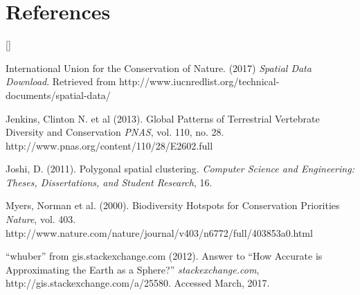\documentclass[11pt, fullpage,letterpaper]{article}
\def\beginrefs{\begin{list}%
        {[\arabic{equation}]}{\usecounter{equation}
         \setlength{\leftmargin}{2.0truecm}\setlength{\labelsep}{0.4truecm}%
         \setlength{\labelwidth}{1.6truecm}}}
\def\endrefs{\end{list}}
\def\bibentry#1{\item[\hbox{[#1]}]}
\begin{document}
	

		\pagebreak
	
	\section*{References}
		\beginrefs

			\bibentry{IUCN 17} International Union for the Conservation of Nature. (2017) \emph{Spatial Data Download}. Retrieved from http://www.iucnredlist.org/technical-documents/spatial-data/
			
			\bibentry{Jenkins 13} Jenkins, Clinton N. et al (2013). Global Patterns of Terrestrial Vertebrate Diversity and Conservation	\emph{PNAS}, vol. 110, no. 28. http://www.pnas.org/content/110/28/E2602.full

			\bibentry{Joshi 11} Joshi, D. (2011). Polygonal spatial clustering.  \emph{Computer Science and Engineering: Theses, Dissertations, and Student Research}, 16.
			
			\bibentry{Myers 00} Myers, Norman et al. (2000). Biodiversity Hotspots for Conservation Priorities	\emph{Nature}, vol. 403. http://www.nature.com/nature/journal/v403/n6772/full/403853a0.html
			
			\bibentry{Whuber 12} ``whuber'' from gis.stackexchange.com (2012). Answer to ``How Accurate is Approximating the Earth as a Sphere?''	\emph{stackexchange.com}, http://gis.stackexchange.com/a/25580. Accessed March, 2017. 


		\endrefs
	

		
		
	
	
\end{document}
